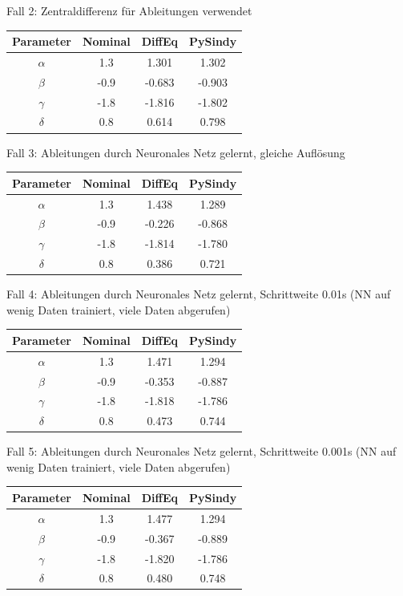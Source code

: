 \documentclass[arbeit=studie,oneside,BCOR=12mm]{ArbeitRST}
\begin{document}
Fall 2: Zentraldifferenz für Ableitungen verwendet\\
\begin{tabular}[h]{c|c|c|c}
Parameter 	& Nominal 	& DiffEq		& PySindy 	\\\hline
$\alpha$ 	&  	 1.3	& 	1.301		&	1.302		\\\hline
$\beta$ 	&  	-0.9	& 	-0.683		&	-0.903		\\\hline
$\gamma$ 	&  	 -1.8	& 	-1.816		&	-1.802		\\\hline
$\delta$ 	&  	0.8		& 	0.614		&	0.798		\\
\end{tabular}

Fall 3: Ableitungen durch Neuronales Netz gelernt, gleiche Auflösung\\
\begin{tabular}[h]{c|c|c|c}
Parameter 	& Nominal 	& DiffEq		& PySindy 	\\\hline
$\alpha$ 	&  	 1.3	& 	1.438		&	1.289		\\\hline
$\beta$ 	&  	-0.9	& 	-0.226		&	-0.868		\\\hline
$\gamma$ 	&  	 -1.8	& 	-1.814		&	-1.780		\\\hline
$\delta$ 	&  	0.8		& 	0.386		&	0.721		\\
\end{tabular}

Fall 4: Ableitungen durch Neuronales Netz gelernt, Schrittweite 0.01s (NN auf wenig Daten trainiert, viele Daten abgerufen)\\
\begin{tabular}[h]{c|c|c|c}
Parameter 	& Nominal 	& DiffEq		& PySindy 	\\\hline
$\alpha$ 	&  	 1.3	& 	1.471		&	1.294		\\\hline
$\beta$ 	&  	-0.9	& 	-0.353		&	-0.887		\\\hline
$\gamma$ 	&  	 -1.8	& 	-1.818		&	-1.786		\\\hline
$\delta$ 	&  	0.8		& 	0.473		&	0.744		\\
\end{tabular}

Fall 5: Ableitungen durch Neuronales Netz gelernt, Schrittweite 0.001s (NN auf wenig Daten trainiert, viele Daten abgerufen)\\
\begin{tabular}[h]{c|c|c|c}
Parameter 	& Nominal 	& DiffEq		& PySindy 	\\\hline
$\alpha$ 	&  	 1.3	& 	1.477		&	1.294		\\\hline
$\beta$ 	&  	-0.9	& 	-0.367		&	-0.889		\\\hline
$\gamma$ 	&  	 -1.8	& 	-1.820		&	-1.786		\\\hline
$\delta$ 	&  	0.8		& 	0.480		&	0.748		\\
\end{tabular}
\end{document}
